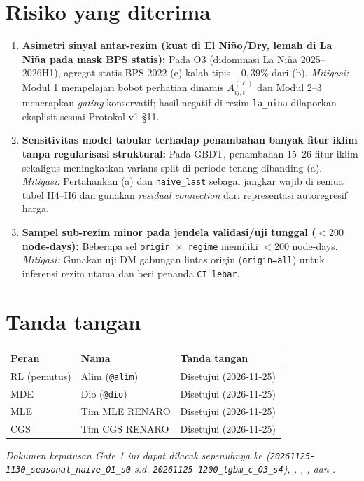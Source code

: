 \documentclass[11pt,a4paper]{article}
\begin{document}
\section{Risiko yang diterima}
\begin{enumerate}
  \item \textbf{Asimetri sinyal antar-rezim (kuat di El Ni\~no/Dry, lemah di La Ni\~na pada mask BPS statis):} Pada O3 (didominasi La Ni\~na 2025--2026H1), agregat statis BPS 2022 (c) kalah tipis $-0{,}39\%$ dari (b). \textit{Mitigasi:} Modul 1 mempelajari bobot perhatian dinamis $A^{(\ell)}_{ij,t}$ dan Modul 2--3 menerapkan \textit{gating} konservatif; hasil negatif di rezim \texttt{la\_nina} dilaporkan eksplisit sesuai Protokol v1 \S11.
  \item \textbf{Sensitivitas model tabular terhadap penambahan banyak fitur iklim tanpa regularisasi struktural:} Pada GBDT, penambahan 15--26 fitur iklim sekaligus meningkatkan varians split di periode tenang dibanding (a). \textit{Mitigasi:} Pertahankan (a) dan \texttt{naive\_last} sebagai jangkar wajib di semua tabel H4--H6 dan gunakan \textit{residual connection} dari representasi autoregresif harga.
  \item \textbf{Sampel sub-rezim minor pada jendela validasi/uji tunggal ($< 200$ node-days):} Beberapa sel \texttt{origin $\times$ regime} memiliki $< 200$ node-days. \textit{Mitigasi:} Gunakan uji DM gabungan lintas origin (\texttt{origin=all}) untuk inferensi rezim utama dan beri penanda \texttt{CI lebar}.
\end{enumerate}

\section{Tanda tangan}
\begin{table}[H]
\centering
\begin{tabular}{@{}L{3.6cm}L{4.8cm}L{4.0cm}@{}}
\toprule
Peran & Nama & Tanda tangan \\
\midrule
RL (pemutus) & Alim (\texttt{@alim}) & Disetujui (2026-11-25) \\
MDE & Dio (\texttt{@dio}) & Disetujui (2026-11-25) \\
MLE & Tim MLE RENARO & Disetujui (2026-11-25) \\
CGS & Tim CGS RENARO & Disetujui (2026-11-25) \\
\bottomrule
\end{tabular}
\end{table}

\vfill
\footnotesize\textit{Dokumen keputusan Gate 1 ini dapat dilacak sepenuhnya ke  (\texttt{20261125-1130\_seasonal\_naive\_O1\_s0} s.d. \texttt{20261125-1200\_lgbm\_c\_O3\_s4}), , , , dan .}
\end{document}

